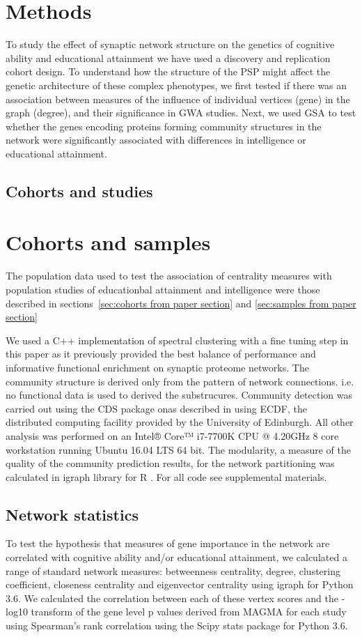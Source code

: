 \section{Methods}
To study the effect of synaptic network structure on the genetics of cognitive ability and educational attainment we have used a discovery and replication cohort design. To understand how the structure of the PSP might affect the genetic architecture of these complex phenotypes, we first tested if there was an association between measures of the influence of individual vertices (gene) in the graph (degree), and their significance in GWA studies. 
Next, we used GSA to test whether the genes encoding proteins forming community structures in the network were significantly associated with differences in intelligence or educational attainment. 

\subsection{Cohorts and studies}
\section{Cohorts and samples}

The population data used to test the association of centrality measures with population studies of educationbal attainment and intelligence were those described in sections~\ref{sec:cohorts from paper section} and \ref{sec:samples from paper section}




We used a C++ implementation of spectral clustering with a fine tuning step in this paper as it previously provided the best balance of performance and informative functional enrichment on synaptic proteome networks. \cite{mclean2016improved}  The community structure is derived only from the pattern of network connections. i.e. no functional data is used to derived the substrucures.
Community detection was carried out using the CDS package onas described in \cite{mclean2016improved} using ECDF, the distributed computing facility provided by the University of Edinburgh. All other analysis was performed on an Intel® Core™ i7-7700K CPU @ 4.20GHz 8 core workstation running Ubuntu 16.04 LTS 64 bit.  
The modularity, a measure of the quality of the community prediction results, for the network partitioning was calculated in igraph library for R \cite{csardi2006igraph} . For all code see supplemental materials. 

\subsection{Network statistics}
To test the hypothesis that measures of gene importance in the network are correlated with cognitive ability and/or educational attainment, we calculated a range of standard network measures: betweenness centrality, degree, clustering coefficient, closeness centrality and eigenvector centrality using igraph for Python 3.6. \cite{csardi2006igraph}  We calculated the correlation between each of these vertex scores and the -log10 transform of the gene level p values derived from MAGMA for each study using Spearman’s rank correlation using the Scipy stats package for Python 3.6. 
